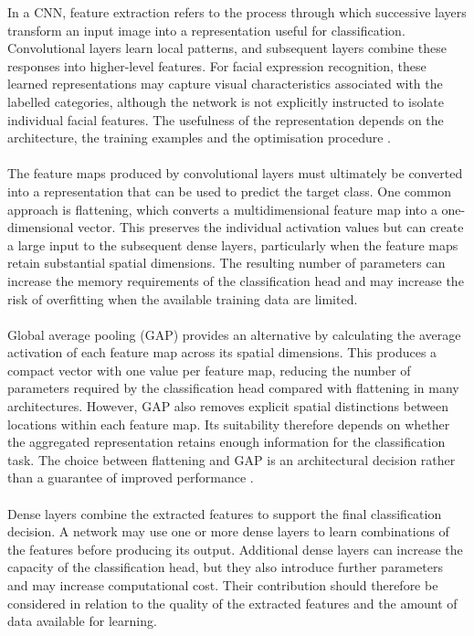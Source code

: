 \documentclass[12pt, a4paper]{report}
\begin{document}
				In a CNN, feature extraction refers to the process through which successive layers transform an input image into a representation useful for classification. Convolutional layers learn local patterns, and subsequent layers combine these responses into higher-level features. For facial expression recognition, these learned representations may capture visual characteristics associated with the labelled categories, although the network is not explicitly instructed to isolate individual facial features. The usefulness of the representation depends on the architecture, the training examples and the optimisation procedure \cite{LeCun1998Gradient, Sutar2023DeepFER}.\\\\
				The feature maps produced by convolutional layers must ultimately be converted into a representation that can be used to predict the target class. One common approach is flattening, which converts a multidimensional feature map into a one-dimensional vector. This preserves the individual activation values but can create a large input to the subsequent dense layers, particularly when the feature maps retain substantial spatial dimensions. The resulting number of parameters can increase the memory requirements of the classification head and may increase the risk of overfitting when the available training data are limited.\\\\
				Global average pooling (GAP) provides an alternative by calculating the average activation of each feature map across its spatial dimensions. This produces a compact vector with one value per feature map, reducing the number of parameters required by the classification head compared with flattening in many architectures. However, GAP also removes explicit spatial distinctions between locations within each feature map. Its suitability therefore depends on whether the aggregated representation retains enough information for the classification task. The choice between flattening and GAP is an architectural decision rather than a guarantee of improved performance \cite{lin2014network}.\\\\
				Dense layers combine the extracted features to support the final classification decision. A network may use one or more dense layers to learn combinations of the features before producing its output. Additional dense layers can increase the capacity of the classification head, but they also introduce further parameters and may increase computational cost. Their contribution should therefore be considered in relation to the quality of the extracted features and the amount of data available for learning.\\\\
\end{document}
